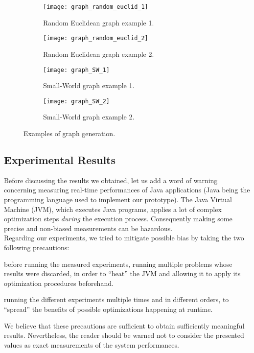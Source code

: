 \begin{figure}
\centering
	\begin{subfigure}[b]{0.45\textwidth}
		\texttt{[image: graph\_random\_euclid\_1]}
		\caption{Random Euclidean graph example 1.}\label{generatedgraphs:rand1}
	\end{subfigure}
	\begin{subfigure}[b]{0.45\textwidth}
			\texttt{[image: graph\_random\_euclid\_2]}
		\caption{Random Euclidean graph example 2.}\label{generatedgraphs:rand2}
	\end{subfigure}
	
	\begin{subfigure}[b]{0.45\textwidth}
		\texttt{[image: graph\_SW\_1]}
		\caption{Small-World graph example 1.}\label{generatedgraphs:sw1}
	\end{subfigure}
	\begin{subfigure}[b]{0.45\textwidth}
			\texttt{[image: graph\_SW\_2]}
		\caption{Small-World graph example 2.}\label{generatedgraphs:sw2}
	\end{subfigure}

\caption{Examples of graph generation.}
\label{graph_generation_examples}
\end{figure}

\subsection{Experimental Results}

Before discussing the results we obtained, let us add a word of warning concerning measuring real-time performances of Java applications (Java being the programming language used to implement our prototype). The Java Virtual Machine (JVM), which executes Java programs, applies a lot of complex optimization steps \emph{during} the execution process. Consequently making some precise and non-biased measurements can be hazardous.\\
Regarding our experiments, we tried to mitigate possible bias by taking the two following precautions:
\begin{compactitem}
\item before running the measured experiments, running multiple problems whose results were discarded, in order to \enquote{heat} the JVM and allowing it to apply its optimization procedures beforehand.
\item running the different experiments multiple times and in different orders, to \enquote{spread} the benefits of possible optimizations happening at runtime.
\end{compactitem}
We believe that these precautions are sufficient to obtain sufficiently meaningful results. Nevertheless, the reader should be warned not to consider the presented values as exact measurements of the system performances.

